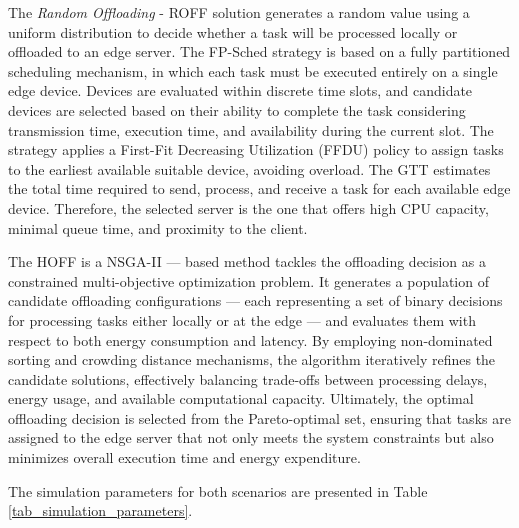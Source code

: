 \documentclass[iicol]{sn-jnl}
\begin{document}
The \textit{Random Offloading} - ROFF \cite{de2021context} solution generates a random value using a uniform distribution to decide whether a task will be processed locally or offloaded to an edge server. The FP-Sched \cite{10757894} strategy is based on a fully partitioned scheduling mechanism, in which each task must be executed entirely on a single edge device. Devices are evaluated within discrete time slots, and candidate devices are selected based on their ability to complete the task considering transmission time, execution time, and availability during the current slot. The strategy applies a First-Fit Decreasing Utilization (FFDU) policy to assign tasks to the earliest available suitable device, avoiding overload. The GTT estimates the total time required to send, process, and receive a task for each available edge device. Therefore, the selected server is the one that offers high CPU capacity, minimal queue time, and proximity to the client. 

The HOFF is a NSGA-II --- based method tackles the offloading decision as a constrained multi-objective optimization problem. It generates a population of candidate offloading configurations --- each representing a set of binary decisions for processing tasks either locally or at the edge --- and evaluates them with respect to both energy consumption and latency. By employing non-dominated sorting and crowding distance mechanisms, the algorithm iteratively refines the candidate solutions, effectively balancing trade-offs between processing delays, energy usage, and available computational capacity. Ultimately, the optimal offloading decision is selected from the Pareto-optimal set, ensuring that tasks are assigned to the edge server that not only meets the system constraints but also minimizes overall execution time and energy expenditure.

The simulation parameters for both scenarios are presented in Table \ref{tab_simulation_parameters}.
\end{document}
